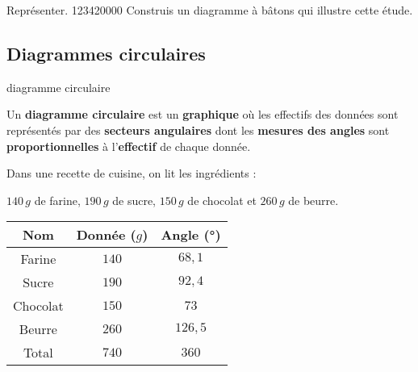 \begin{pageAD}
\begin{ExoCad}{ Représenter. }{1234}{2}{0}{0}{0}{0}
Construis un diagramme à bâtons qui illustre cette étude.

\end{ExoCad} 

\end{pageAD}



\begin{pageCours} 

\section{Diagrammes circulaires}
\begin{DefT}{diagramme circulaire}

Un \textbf{diagramme circulaire} est un \textbf{graphique} où les effectifs des données sont représentés par des \textbf{secteurs angulaires} dont les \textbf{mesures des angles} sont \textbf{proportionnelles} à l'\textbf{effectif} de chaque donnée. 

\end{DefT}

\begin{Ex}

Dans une recette de cuisine, on lit les ingrédients :

$140\,g$ de farine, $190\,g$ de sucre, $150\,g$ de chocolat et $260\,g$ de beurre.

\begin{minipage}{0.48\linewidth}

\begin{tabular}{|c|c|c|}\hline
Nom & Donnée ($g$) & Angle (°) \\\hline
Farine &  \textcolor{sacado_violet}{$140$} & $68,1$ \\\hline
Sucre & \textcolor{bleu2}{$190$} & $92,4$ \\\hline
Chocolat &  \textcolor{sacado_yellow}{$150$} &  $73$ \\\hline
Beurre & \textcolor{sacado_orange}{$260$} & $126,5$ \\\hline
Total & $740$ &  $360$ \\\hline
\end{tabular}
\end{minipage}
\begin{minipage}{0.48\linewidth}
\end{minipage}


\end{Ex}
\end{pageCours}
